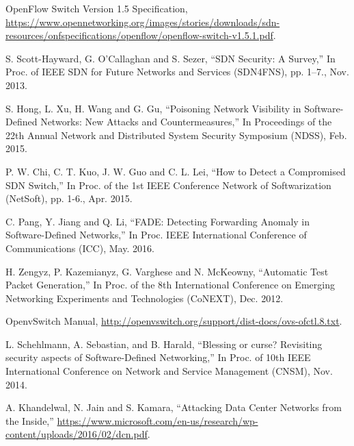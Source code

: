 \documentclass[conference]{IEEEtran}
\begin{document}
%
%
%
\begin{thebibliography}{1}

OpenFlow Switch Version 1.5 Specification, \url{https://www.opennetworking.org/images/stories/downloads/sdn-resources/onfspecifications/openflow/openflow-switch-v1.5.1.pdf}.

S. Scott-Hayward, G. O’Callaghan and S. Sezer,
``SDN Security: A Survey,'' In Proc. of IEEE SDN for Future Networks and Services (SDN4FNS), pp. 1–7., Nov. 2013.

S. Hong, L. Xu, H. Wang and G. Gu,
``Poisoning Network Visibility in Software-Defined Networks: New Attacks and Countermeasures,''  In Proceedings of the 22th Annual Network and Distributed System Security Symposium (NDSS), Feb. 2015.

P. W. Chi, C. T. Kuo, J. W. Guo and C. L. Lei,
``How to Detect a Compromised SDN Switch,'' In Proc. of the 1st IEEE Conference Network of Softwarization (NetSoft), pp. 1-6., Apr. 2015.

C. Pang, Y. Jiang and Q. Li,
``FADE: Detecting Forwarding Anomaly in Software-Defined Networks,'' In Proc. IEEE International Conference of Communications (ICC), May. 2016.

H. Zengyz, P. Kazemianyz, G. Varghese and N. McKeowny,
``Automatic Test Packet Generation,'' In Proc. of the 8th International Conference on Emerging Networking Experiments and Technologies (CoNEXT), Dec. 2012.

OpenvSwitch Manual, \url{http://openvswitch.org/support/dist-docs/ovs-ofctl.8.txt}.

L. Schehlmann, A. Sebastian, and B. Harald, 
``Blessing or curse? Revisiting security aspects of Software-Defined Networking,'' In Proc. of 10th IEEE International Conference on Network and Service Management (CNSM), Nov. 2014.

A. Khandelwal, N. Jain and S. Kamara,
``Attacking Data Center Networks from the Inside,'' \url{https://www.microsoft.com/en-us/research/wp-content/uploads/2016/02/dcn.pdf}.
 

\end{thebibliography}
\end{document}
